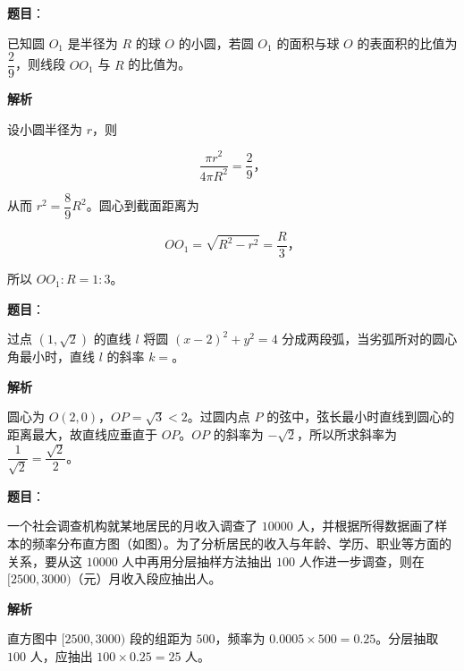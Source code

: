 \begin{answer}

\textbf{题目}：

已知圆 $O_1$ 是半径为 $R$ 的球 $O$ 的小圆，若圆 $O_1$ 的面积与球 $O$ 的表面积的比值为 $\dfrac29$，则线段 $OO_1$ 与 $R$ 的比值为\gkblank{}。

\textbf{解析}

设小圆半径为 $r$，则

\nopagebreak[4]
\[
\frac{\pi r^2}{4\pi R^2}=\frac29\text{，}
\]

从而 $r^2=\dfrac89R^2$。圆心到截面距离为

\nopagebreak[4]
\[
OO_1=\sqrt{R^2-r^2}=\frac R3\text{，}
\]

所以 $OO_1:R=1:3$。


\end{answer}
\begin{answer}

\textbf{题目}：

过点 $(1,\sqrt2)$ 的直线 $l$ 将圆 $(x-2)^2+y^2=4$ 分成两段弧，当劣弧所对的圆心角最小时，直线 $l$ 的斜率 $k=$\gkblank{}。

\textbf{解析}

圆心为 $O(2,0)$，$OP=\sqrt3<2$。过圆内点 $P$ 的弦中，弦长最小时直线到圆心的距离最大，故直线应垂直于 $OP$。$OP$ 的斜率为 $-\sqrt2$，所以所求斜率为 $\dfrac1{\sqrt2}=\dfrac{\sqrt2}{2}$。


\end{answer}
\begin{answer}

\textbf{题目}：

一个社会调查机构就某地居民的月收入调查了 $10000$ 人，并根据所得数据画了样本的频率分布直方图（如图）。为了分析居民的收入与年龄、学历、职业等方面的关系，要从这 $10000$ 人中再用分层抽样方法抽出 $100$ 人作进一步调查，则在 $[2500,3000)$（元）月收入段应抽出\gkblank{}人。
\nopagebreak[4]
\begin{center}\end{center}
\nopagebreak[4]
\textbf{解析}

直方图中 $[2500,3000)$ 段的组距为 $500$，频率为 $0.0005\times500=0.25$。分层抽取 $100$ 人，应抽出 $100\times0.25=25$ 人。


\end{answer}
